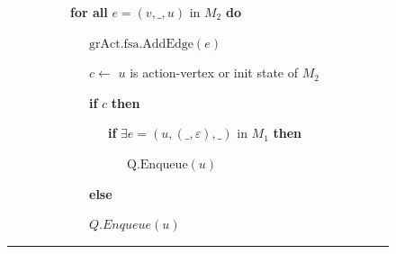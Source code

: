\begin{figure}
\ \ \ \ \ \ \ \ \ \ \textbf{for all} {$e = (v, \_, u)$ in $M_2$} \textbf{do}





\ \ \ \ \ \ \ \ \ \ \ \ \ {$\mathrm{grAct.fsa.AddEdge}(e)$}





\ \ \ \ \ \ \ \ \ \ \ \ \ {$c \gets $ $u$ is action-vertex or init state of $M_2$}





\ \ \ \ \ \ \ \ \ \ \ \ \ \textbf{if} {$c$} \textbf{then}





\ \ \ \ \ \ \ \ \ \ \ \ \ \ \ \ \textbf{if} {$\exists e = (u, (\_, \varepsilon), \_)$ in $M_1$} \textbf{then}





\ \ \ \ \ \ \ \ \ \ \ \ \ \ \ \ \ \ \ {$\mathrm{Q.Enqueue}(u)$}





\ \ \ \ \ \ \ \ \ \ \ \ \ \textbf{else}





\ \ \ \ \ \ \ \ \ \ \ \ \  {$Q.Enqueue(u)$}

















\vspace*{3pt}





\hrule





\vspace*{3pt}





\end{figure}








